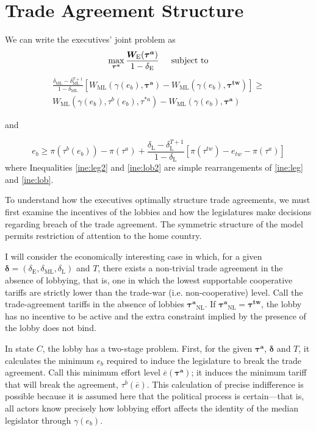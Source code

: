 \documentclass[authoryear, review]{elsarticle}
\newcommand{\ov}{\overline}
\newcommand{\bta}{\bm{\tau^a}}
\newcommand{\ga}{\gamma}
\newcommand{\btw}{\bm{\tau^{tw}}}
\newcommand{\de}{\delta}
\begin{document}
\section{Trade Agreement Structure}
\label{sec:structure}
We can write the executives' joint problem as
\begin{equation}
  \max_{\bta} \frac{\bm{W_\text{E}}(\bta)}{1-\de_\text{E}} \hskip.2in \text{subject to}
  \label{prob:max}
\end{equation}
\begin{multline}
  \frac{\de_\text{ML} - \de_\text{ML}^{T+1}}{1-\de_\text{ML}} \left[W_\text{ML}(\ga(e_b),\bta) - W_{\text{ML}}(\ga(e_b),\btw) \right] \geq \\
	W_{\text{ML}}(\ga(e_b),\tau^b(e_b),\tau^{*a}) - W_{\text{ML}}(\ga(e_b),\bta)
  \label{ine:leg2}
\end{multline}
\begin{center}
and
\end{center}
\begin{equation}
  e_b \geq \pi(\tau^b(e_b)) - \pi(\tau^a) + \frac{\de_\text{L} - \de_\text{L}^{T+1}}{1-\de_\text{L}} \left[\pi(\tau^{tw}) -e_{tw} - \pi(\tau^a) \right]
  \label{ine:lob2}
\end{equation}
where Inequalities \ref{ine:leg2} and \ref{ine:lob2} are simple rearrangements of \ref{ine:leg} and \ref{ine:lob}.

To understand how the executives optimally structure trade agreements, we must first examine the incentives of the lobbies and how the legislatures make decisions regarding breach of the trade agreement. The symmetric structure of the model permits restriction of attention to the home country.

I will consider the economically interesting case in which, for a given $\bm{\de}=\left(\de_\text{E},\de_\text{ML},\de_\text{L}\right)$ and $T$, there exists a non-trivial trade agreement in the absence of lobbying, that is, one in which the lowest supportable cooperative tariffs are strictly lower than the trade-war (i.e. non-cooperative) level. Call the trade-agreement tariffs in the absence of lobbies $\bta_{\text{NL}}$. If $\bta_{\text{NL}} = \btw$, the lobby has no incentive to be active and the extra constraint implied by the presence of the lobby does not bind.

In state $C$, the lobby has a two-stage problem. First, for the given $\bta$, $\bm{\de}$ and $T$, it calculates the minimum $e_b$ required to induce the legislature to break the trade agreement. Call this minimum effort level $\ov{e}(\bta)$; it induces the minimum tariff that will break the agreement, $\tau^b(\ov{e})$. This calculation of precise indifference is possible because it is assumed here that the political process is certain---that is, all actors know precisely how lobbying effort affects the identity of the median legislator through $\ga(e_b)$.
\end{document}
